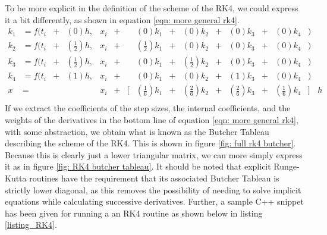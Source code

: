 \documentclass[onecolumn,titlepage,letterpaper,10pt]{article}
\begin{document}
To be more explicit in the definition of the scheme of the RK4, we could express
it a bit differently, as shown in equation \eqref{eqn: more general rk4}.
\begin{equation}
\begin{aligned}
	k_1 &= f(t_i & + &(          0)h, &x_i& + & &           (0)k_1& + &           (0)k_2& + &           (0)k_3& + &           (0)k_4&)&\\
    k_2 &= f(t_i & + &(\frac{1}{2})h, &x_i& + & & (\frac{1}{2})k_1& + &           (0)k_2& + &           (0)k_3& + &           (0)k_4&)&\\
    k_3 &= f(t_i & + &(\frac{1}{2})h, &x_i& + & &           (0)k_1& + & (\frac{1}{2})k_2& + &           (0)k_3& + &           (0)k_4&)&\\
    k_4 &= f(t_i & + &(          1)h, &x_i& + & &           (0)k_1& + &           (0)k_2& + &           (1)k_3& + &           (0)k_4&)&\\
	x   &=       &   &                &x_i& + &[& (\frac{1}{6})k_1& + & (\frac{2}{6})k_2& + & (\frac{2}{6})k_3& + & (\frac{1}{6})k_4 &]&h\\
    \label{eqn: more general rk4}
\end{aligned}
\end{equation}
If we extract the coefficients of the step sizes, the internal
coefficients, and the weights of the derivatives in the bottom line of equation
\eqref{eqn: more general rk4}, with some abstraction, we obtain what is known
as the Butcher Tableau describing the scheme of the RK4. This is shown in figure
\ref{fig: full rk4 butcher}. Because this is clearly just a lower triangular
matrix, we can more simply express it as in figure \ref{fig: RK4 butcher tableau}.
It should be noted that explicit Runge-Kutta routines have the requirement that
its associated Butcher Tableau is strictly lower diagonal, as this removes
the possibility of
needing to solve implicit equations while calculating successive derivatives.
Further, a sample C++ snippet has been given for running a an RK4 routine as
shown below in listing \ref{listing_RK4}.
\end{document}
